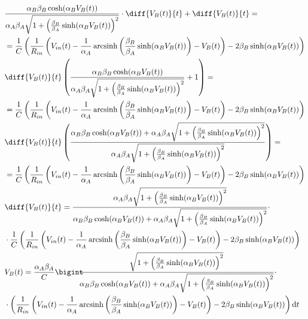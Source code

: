 		\begin{equation}
			\label{eq:sostituzione}
			\begin{split}
				&\frac{\alpha_{B}\beta_{B}\cosh(\alpha_{B}V_{B}(t))}{\alpha_{A}\beta_{A}\sqrt{1+\left(\frac{\beta_{B}}{\beta_{A}}\sinh(\alpha_{B}V_{B}(t))\right)^{2}}}\cdot\diff{V_{B}(t)}{t}+\diff{V_{B}(t)}{t} =\\&= \frac{1}{C}\left(\frac{1}{R_{in}}\left(V_{in}(t)-\frac{1}{\alpha_{A}} \arcsinh \left(\frac{\beta_{B}}{\beta_{A}} \sinh(\alpha_{B}V_{B}(t))\right)-V_{B}(t)\right)-2\beta_{B}\sinh(\alpha_{B}V_{B}(t))\right)\\
				&\diff{V_{B}(t)}{t}\left(\frac{\alpha_{B}\beta_{B}\cosh(\alpha_{B}V_{B}(t))}{\alpha_{A}\beta_{A}\sqrt{1+\left(\frac{\beta_{B}}{\beta_{A}}\sinh(\alpha_{B}V_{B}(t))\right)^{2}}}+1\right) =\\&= \frac{1}{C}\left(\frac{1}{R_{in}}\left(V_{in}(t)-\frac{1}{\alpha_{A}} \arcsinh \left(\frac{\beta_{B}}{\beta_{A}} \sinh(\alpha_{B}V_{B}(t))\right)-V_{B}(t)\right)-2\beta_{B}\sinh(\alpha_{B}V_{B}(t))\right)\\
				&\diff{V_{B}(t)}{t}\left(\frac{\alpha_{B}\beta_{B}\cosh(\alpha_{B}V_{B}(t))+\alpha_{A}\beta_{A}\sqrt{1+\left(\frac{\beta_{B}}{\beta_{A}}\sinh(\alpha_{B}V_{B}(t))\right)^{2}}}{\alpha_{A}\beta_{A}\sqrt{1+\left(\frac{\beta_{B}}{\beta_{A}}\sinh(\alpha_{B}V_{B}(t))\right)^{2}}}\right) =\\&= \frac{1}{C}\left(\frac{1}{R_{in}}\left(V_{in}(t)-\frac{1}{\alpha_{A}} \arcsinh \left(\frac{\beta_{B}}{\beta_{A}} \sinh(\alpha_{B}V_{B}(t))\right)-V_{B}(t)\right)-2\beta_{B}\sinh(\alpha_{B}V_{B}(t))\right)\\
				&\diff{V_{B}(t)}{t} = \frac{\alpha_{A}\beta_{A}\sqrt{1+\left(\frac{\beta_{B}}{\beta_{A}}\sinh(\alpha_{B}V_{B}(t))\right)^{2}}}{\alpha_{B}\beta_{B}\cosh(\alpha_{B}V_{B}(t))+\alpha_{A}\beta_{A}\sqrt{1+\left(\frac{\beta_{B}}{\beta_{A}}\sinh(\alpha_{B}V_{B}(t))\right)^{2}}}\cdot\\&\cdot\frac{1}{C}\left(\frac{1}{R_{in}}\left(V_{in}(t)-\frac{1}{\alpha_{A}} \arcsinh \left(\frac{\beta_{B}}{\beta_{A}} \sinh(\alpha_{B}V_{B}(t))\right)-V_{B}(t)\right)-2\beta_{B}\sinh(\alpha_{B}V_{B}(t))\right)\\
				&V_{B}(t) = \frac{\alpha_{A}\beta_{A}}{C}\Int{\frac{\sqrt{1+\left(\frac{\beta_{B}}{\beta_{A}}\sinh(\alpha_{B}V_{B}(t))\right)^{2}}}{\alpha_{B}\beta_{B}\cosh(\alpha_{B}V_{B}(t))+\alpha_{A}\beta_{A}\sqrt{1+\left(\frac{\beta_{B}}{\beta_{A}}\sinh(\alpha_{B}V_{B}(t))\right)^{2}}}\cdot\\&\cdot\left(\frac{1}{R_{in}}\left(V_{in}(t)-\frac{1}{\alpha_{A}} \arcsinh \left(\frac{\beta_{B}}{\beta_{A}} \sinh(\alpha_{B}V_{B}(t))\right)-V_{B}(t)\right)-2\beta_{B}\sinh(\alpha_{B}V_{B}(t))\right)}{t}\\
			\end{split}
		\end{equation}
		
